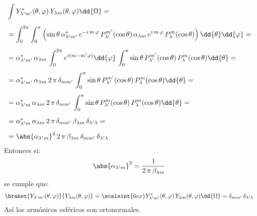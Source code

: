 \begin{align}
\begin{aligned}[b]
&\int Y_{\lambda^\prime m^{\prime}}^{*} (\theta, \varphi) \, Y_{\lambda m} (\theta, \varphi) \dd{\Omega} = \\[0.5em]
&= \int_{0}^{2 \pi} \int_{0}^{\pi} \left( \sin \theta \, \alpha_{\lambda^{\prime} m^{\prime}}^{*} \, e^{-i  \, m \, \varphi} \, P_{\lambda^{\prime}}^{m^{\prime}} (\cos \theta) \, \alpha_{\lambda m} \, e^{i  \, m \, \varphi} \, P_{\lambda}^{m} (\cos \theta) \right) \dd{\theta} \dd{\varphi} = \\[0.5em]
&= \alpha_{\lambda^{\prime} m^{\prime}}^{*} \, \alpha_{\lambda m} \, \int_{0}^{2 \pi} e^{i (m - m^{\prime} \varphi)} \dd{\varphi} \, \int_{0}^{\pi} \sin \theta \, P_{\lambda^{\prime}}^{m^{\prime}} (\cos \theta) \, P_{\lambda}^{m} (\cos \theta) \dd{\theta} = \\[0.5em]
&= \alpha_{\lambda^{\prime} m^{\prime}}^{*} \, \alpha_{\lambda m} \, 2 \, \pi \, \delta_{m m^{\prime}} \, \int_{0}^{\pi} \sin \theta \, P_{\lambda^{\prime}}^{m^{\prime}} (\cos \theta) \, P_{\lambda}^{m} (\cos \theta) \dd{\theta} = \\[0.5em]
&= \alpha_{\lambda^{\prime} m}^{*} \, \alpha_{\lambda m} \, 2 \, \pi \, \delta_{m m^{\prime}} \, \int_{0}^{\pi} \sin \theta \, P_{\lambda^{\prime}}^{m} (\cos \theta) \, P_{\lambda}^{m} (\cos \theta) \dd{\theta} = \\[0.5em]
&= \alpha_{\lambda^{\prime} m}^{*} \, \alpha_{\lambda m} \, 2 \, \pi \, \delta_{m m^{\prime}} \, \beta_{\lambda m} \, \delta_{\lambda^{\prime} \lambda} = \\[0.5em]
&= \abs{\alpha_{\lambda^{\prime} m}}^{2} \, 2 \, \pi \, \beta_{\lambda m} \, \delta_{m m^{\prime}} \,\delta_{\lambda^{\prime} \lambda}
\end{aligned}
\label{eq:ecuacion_10_125}
\end{align}
Entonces si:
\begin{align}
\abs{\alpha_{\lambda^{\prime} m}}^{2} = \dfrac{1}{2 \, \pi \, \beta_{\lambda m}}
\label{eq:ecuacion_10_126}
\end{align}
se cumple que:
\begin{align}
\braket{Y_{\lambda^{\prime} m^{\prime}}(\theta, \varphi)}{Y_{\lambda m}(\theta, \varphi)} = \scaleint{6ex} Y_{\lambda^\prime m^{\prime}}^{*} (\theta, \varphi) \, Y_{\lambda m} (\theta, \varphi) \dd{\Omega} = \delta_{m m^{\prime}} \, \delta_{\lambda^{\prime} \lambda}
\label{eq:ecuacion_10_127}
\end{align}
Así los armónicos esféricos son ortonormales.

